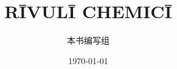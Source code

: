 \newcommand{\cellatom}[5]{%
    \node[circle, shading=ball, ball color=#1, inner sep=0pt,
          minimum size={2*#5 cm}] at ({#2},{#3},{#4}) {};%
}


\title{RĪVULĪ CHEMICĪ}
\author{本书编写组}
\date{\today}
